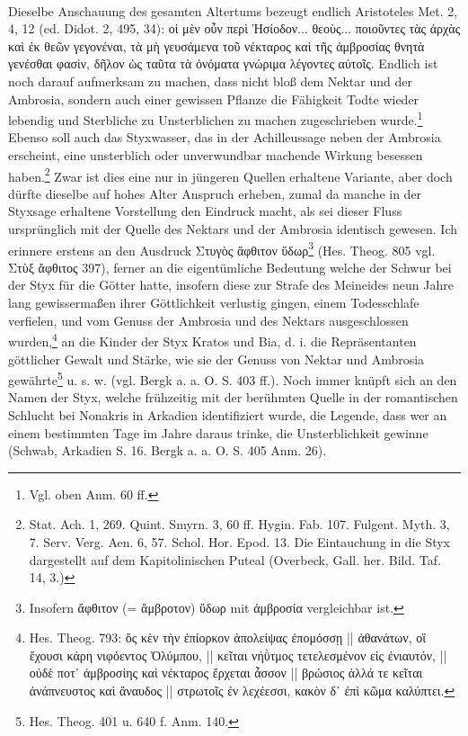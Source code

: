 \documentclass[a4paper, 11pt, oneside]{article}
\begin{document}
\paragraph{}
Dieselbe Anschauung des gesamten Altertums bezeugt endlich Aristoteles Met. 2, 4, 12 (ed. Didot. 2, 495, 34): οἱ μὲν οὖν περὶ Ἡσίοδον... θεοὺς... ποιοῦντες τὰς ἀρχὰς καὶ ἐκ θεῶν γεγονέναι, τὰ μὴ γευσάμενα τοῦ νέκταρος καὶ τῆς ἀμβροσίας θνητὰ γενέσθαι φασὶν, δῆλον ὡς ταῦτα τὰ ὀνόματα γνώριμα λέγοντες αὐτοῖς. Endlich ist noch darauf aufmerksam zu machen, dass nicht bloß dem Nektar und der Ambrosia, sondern auch einer gewissen Pflanze die Fähigkeit Todte wieder lebendig und Sterbliche zu Unsterblichen zu machen zugeschrieben wurde.\footnote{Vgl. oben Anm. 60 ff.} Ebenso soll auch das Styxwasser, das in der Achilleussage neben der Ambrosia erscheint, eine unsterblich oder unverwundbar machende Wirkung besessen haben.\footnote{Stat. Ach. 1, 269. Quint. Smyrn. 3, 60 ff. Hygin. Fab. 107. Fulgent. Myth. 3, 7. Serv. Verg. Aen. 6, 57. Schol. Hor. Epod. 13. Die Eintauchung in die Styx dargestellt auf dem Kapitolinischen Puteal (Overbeck, Gall. her. Bild. Taf. 14, 3.)} Zwar ist dies eine nur in jüngeren Quellen erhaltene Variante, aber doch dürfte dieselbe auf hohes Alter Anspruch erheben, zumal da manche in der Styxsage erhaltene Vorstellung den Eindruck macht, als sei dieser Fluss ursprünglich mit der Quelle des Nektars und der Ambrosia identisch gewesen. Ich erinnere erstens an den Ausdruck Στυγὸς ἄφθιτον ὕδωρ\footnote{Insofern ἄφθιτον (= ἄμβροτον) ὕδωρ mit ἀμβροσία vergleichbar ist.} (Hes. Theog. 805 vgl. Στὺξ ἄφθιτος 397), ferner an die eigentümliche Bedeutung welche der Schwur bei der Styx für die Götter hatte, insofern diese zur Strafe des Meineides neun Jahre lang gewissermaßen ihrer Göttlichkeit verlustig gingen, einem Todesschlafe verfielen, und vom Genuss der Ambrosia und des Nektars ausgeschlossen wurden,\footnote{Hes. Theog. 793: ὅς κὲν τὴν ἐπίορκον ἀπολείψας ἐπομόσσῃ || ἀθανάτων, οἳ ἔχουσι κάρη νιφόεντος Ὀλύμπου, || κεῖται νήῢτμος τετελεσμένον εἰς ἐνιαυτόν, || οὐδὲ ποτ᾽ ἀμβροσίης καὶ νέκταρος ἔρχεται ἆσσον || βρώσιος ἀλλά τε κεῖται ἀνάπνευστος καὶ ἄναυδος || στρωτοῖς ἐν λεχέεσσι, κακὸν δ᾽ ἐπὶ κῶμα καλύπτει.} an die Kinder der Styx Kratos und Bia, d. i. die Repräsentanten göttlicher Gewalt und Stärke, wie sie der Genuss von Nektar und Ambrosia gewährte\footnote{Hes. Theog. 401 u. 640 f. Anm. 140.} u. s. w. (vgl. Bergk a. a. O. S. 403 ff.). Noch immer knüpft sich an den Namen der Styx, welche frühzeitig mit der berühmten Quelle in der romantischen Schlucht bei Nonakris in Arkadien identifiziert wurde, die Legende, dass wer an einem bestimmten Tage im Jahre daraus trinke, die Unsterblichkeit gewinne (Schwab, Arkadien S. 16. Bergk a. a. O. S. 405 Anm. 26).
\end{document}

